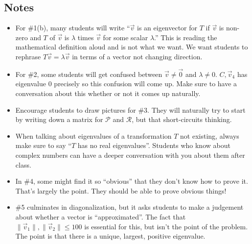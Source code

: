 \documentclass[red]{tutorial}
\theoremstyle{definition}
\theoremstyle{theorem}
\begin{document}
{\begin{instructions}
  \subsection*{Notes}
  \begin{itemize}
    \item For \#1(b), many students will write ``$\vec v$ is an eigenvector for $T$ if
      $\vec v$ is non-zero and $T$ of $\vec v$ is $\lambda$ times $\vec v$ for some scalar
      $\lambda$.'' This is reading the mathematical definition aloud and is not what we want.
      We want students to rephrase $T\vec v=\lambda \vec v$ in terms of a vector not changing
      direction.
    \item For \#2, some students will get confused between $\vec v\neq \vec 0$ and $\lambda \neq 0$.
      $C,\vec v_4$ has eigenvalue $0$ precisely so this confusion will come up. Make sure to
      have a conversation about this whether or not it comes up naturally.
    \item Encourage students to draw pictures for \#3. They will naturally try to start by writing
      down a matrix for $\mathcal P$ and $\mathcal R$, but that short-circuits thinking.
    \item
      When talking about eigenvalues of a transformation $T$
      not existing, always make sure to say ``$T$ has no real eigenvalues''. Students who
      know about complex numbers can have a deeper conversation with you about them after class.
    \item In \#4, some might find it so ``obvious'' that they don't know how to prove it. That's largely
      the point. They should be able to prove obvious things!
    \item \#5 culminates in diagonalization, but it asks students to make a judgement about whether
      a vector is ``approximated''. The fact that $\|\vec v_1\|,\|\vec v_2\|\leq 100$ is essential
      for this, but isn't the point of the problem. The point is that there is a unique, largest, positive
      eigenvalue.
  \end{itemize}
\end{instructions}
}
\end{document}
